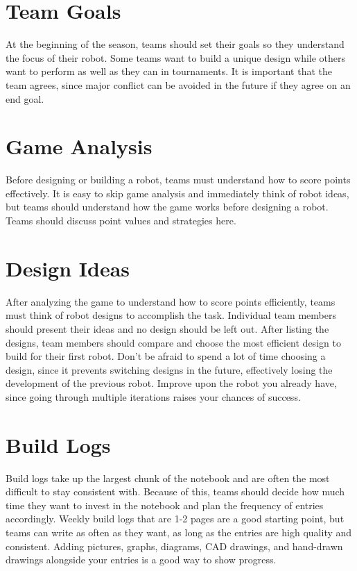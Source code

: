 \documentclass[letterpaper, 12pt]{article}
\begin{document}
\section*{Team Goals}

At the beginning of the season, teams should set their goals so they understand the focus of their robot. Some teams want to build a unique design while others want to perform as well as they can in tournaments. It is important that the team agrees, since major conflict can be avoided in the future if they agree on an end goal.

\section*{Game Analysis}

Before designing or building a robot, teams must understand how to score points effectively. It is easy to skip game analysis and immediately think of robot ideas, but teams should understand how the game works before designing a robot. Teams should discuss point values and strategies here.

\section*{Design Ideas}

After analyzing the game to understand how to score points efficiently, teams must think of robot designs to accomplish the task. Individual team members should present their ideas and no design should be left out. After listing the designs, team members should compare and choose the most efficient design to build for their first robot. Don’t be afraid to spend a lot of time choosing a design, since it prevents switching designs in the future, effectively losing the development of the previous robot. Improve upon the robot you already have, since going through multiple iterations raises your chances of success.

\section*{Build Logs}

Build logs take up the largest chunk of the notebook and are often the most difficult to stay consistent with. Because of this, teams should decide how much time they want to invest in the notebook and plan the frequency of entries accordingly. Weekly build logs that are 1-2 pages are a good starting point, but teams can write as often as they want, as long as the entries are high quality and consistent. Adding pictures, graphs, diagrams, CAD drawings, and hand-drawn drawings alongside your entries is a good way to show progress.
\end{document}

